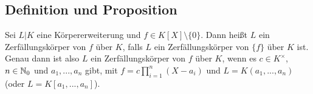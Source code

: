 \subsection{Definition und Proposition} Sei $L|K$ eine Körpererweiterung und $f \in K[X] \setminus \{0\}$. Dann heißt $L$ ein Zerfällungskörper von $f$ über $K$, falls $L$ ein Zerfällungskörper von $\{f\}$ über $K$ ist. Genau dann ist also $L$ ein Zerfällungskörper von $f$ über $K$, wenn es $c \in K^\times$, $n \in \mathbb N_0$ und $a_1,...,a_n$ gibt, mit $f = c \prod_{i=1}^n (X-a_i)$ und $L = K(a_1,...,a_n)$ (oder $L=K[a_1,...,a_n]$).
